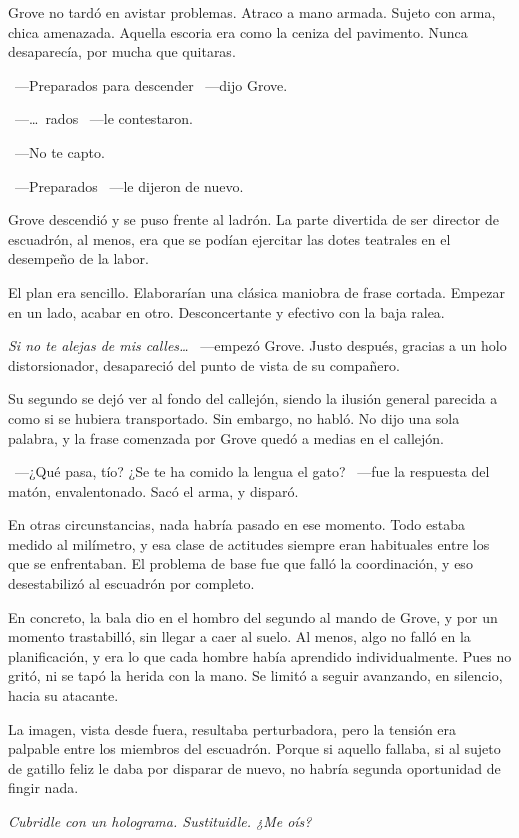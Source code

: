 Grove no tardó en avistar problemas. Atraco a mano armada. Sujeto con arma, chica amenazada. Aquella escoria era como la ceniza del pavimento. Nunca desaparecía, por mucha que quitaras.

~---Preparados para descender ~---dijo Grove.

~---\dots\ rados ~---le contestaron.

~---No te capto.

~---Preparados ~---le dijeron de nuevo.

Grove descendió y se puso frente al ladrón. La parte divertida de ser director de escuadrón, al menos, era que se podían ejercitar las dotes teatrales en el desempeño de la labor.

El plan era sencillo. Elaborarían una clásica maniobra de frase cortada. Empezar en un lado, acabar en otro. Desconcertante y efectivo con la baja ralea.

\emph{Si no te alejas de mis calles\dots} ~---empezó Grove. Justo después, gracias a un holo distorsionador, desapareció del punto de vista de su compañero.

Su segundo se dejó ver al fondo del callejón, siendo la ilusión general parecida a como si se hubiera transportado. Sin embargo, no habló. No dijo una sola palabra, y la frase comenzada por Grove quedó a medias en el callejón.

~---¿Qué pasa, tío? ¿Se te ha comido la lengua el gato? ~---fue la respuesta del matón, envalentonado. Sacó el arma, y disparó.

En otras circunstancias, nada habría pasado en ese momento. Todo estaba medido al milímetro, y esa clase de actitudes siempre eran habituales entre los que se enfrentaban. El problema de base fue que falló la coordinación, y eso desestabilizó al escuadrón por completo.

En concreto, la bala dio en el hombro del segundo al mando de Grove, y por un momento trastabilló, sin llegar a caer al suelo. Al menos, algo no falló en la planificación, y era lo que cada hombre había aprendido individualmente. Pues no gritó, ni se tapó la herida con la mano. Se limitó a seguir avanzando, en silencio, hacia su atacante.

La imagen, vista desde fuera, resultaba perturbadora, pero la tensión era palpable entre los miembros del escuadrón. Porque si aquello fallaba, si al sujeto de gatillo feliz le daba por disparar de nuevo, no habría segunda oportunidad de fingir nada.

\emph{Cubridle con un holograma. Sustituidle. ¿Me oís?}

